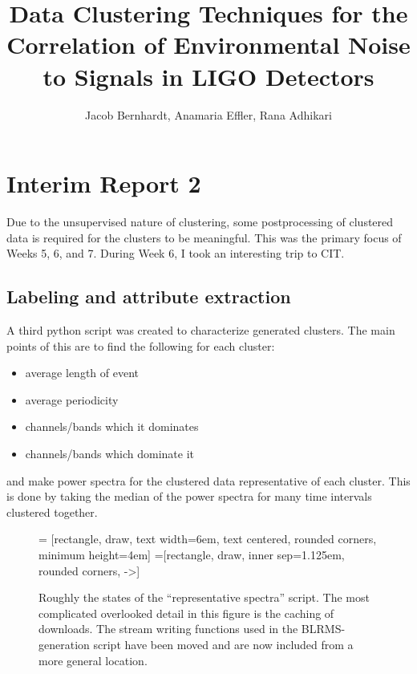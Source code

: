 \documentclass[colorlinks=true,pdfstartview=FitV,linkcolor=blue,
            citecolor=red,urlcolor=magenta]{ligodoc}
\title{Data Clustering Techniques for the Correlation of Environmental Noise to Signals in LIGO Detectors}
\author{Jacob Bernhardt, Anamaria Effler, Rana Adhikari}
\begin{document}


\section{Interim Report 2}

Due to the unsupervised nature of clustering, some postprocessing of clustered data is required for the clusters to be meaningful.
This was the primary focus of Weeks 5, 6, and 7.
During Week 6, I took an interesting trip to CIT.

\subsection{Labeling and attribute extraction}
A third python script was created to characterize generated clusters.
The main points of this are to find the following for each cluster:
\begin{itemize}
\item average length of event
\item average periodicity
\item channels/bands which it dominates
\item channels/bands which dominate it
\end{itemize}
and make power spectra for the clustered data representative of each cluster.
This is done by taking the median of the power spectra for many time intervals clustered together.
\begin{figure}[h]
   = [rectangle, draw, text width=6em, text centered, rounded corners, minimum height=4em]
   =[rectangle, draw, inner sep=1.125em, rounded corners, ->]
  \caption{Roughly the states of the ``representative spectra'' script. The most complicated overlooked detail in this figure is the caching of downloads. The stream writing functions used in the BLRMS-generation script have been moved and are now included from a more general location.}
\end{figure}
\end{document}

